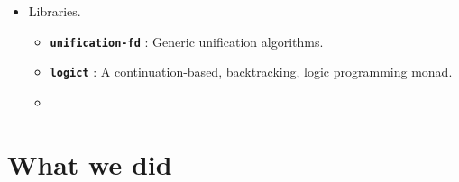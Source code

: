 \documentclass[hideothersubsections, t, aspectratio=1610]{beamer}
\providecommand\codeLibrary[1]{\texttt{\bfseries #1}}
\begin{document}
\begin{frame}
\begin{itemize}
\item Libraries.
\begin{itemize}
\item \codeLibrary{unification-fd} : Generic unification algorithms. 

\item \codeLibrary{logict} : A continuation-based, backtracking, logic programming monad.

\item \codeLibrary{}
\note[item]{}

\end{itemize}

\end{itemize}

\end{frame}



\section{What we did}

\end{document}
